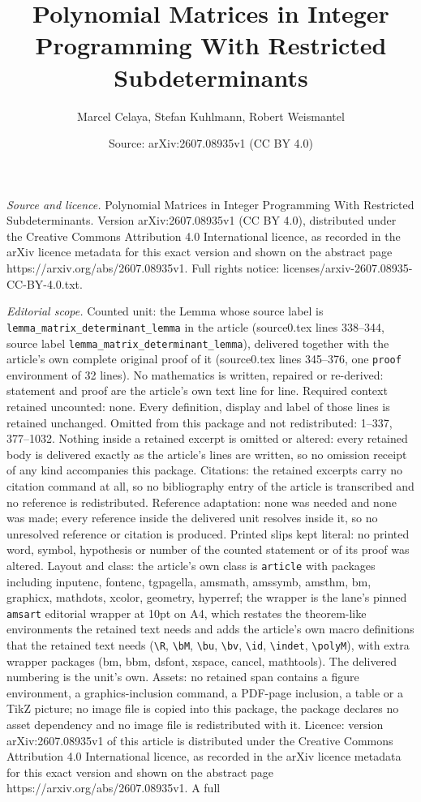 \documentclass[10pt,a4paper]{amsart}
\title[Polynomial Matrices in Integer Programming With Restricted S]{Polynomial Matrices in Integer Programming With Restricted Subdeterminants}
\author{Marcel Celaya, Stefan Kuhlmann, Robert Weismantel}
\date{Source: arXiv:2607.08935v1 (CC BY 4.0)}
\begin{document}
\maketitle

\noindent\emph{Source and licence.} Polynomial Matrices in Integer Programming With Restricted Subdeterminants. Version arXiv:2607.08935v1 (CC BY 4.0), distributed under the Creative Commons Attribution 4.0 International licence, as recorded in the arXiv licence metadata for this exact version and shown on the abstract page https://arxiv.org/abs/2607.08935v1. Full rights notice: licenses/arxiv-2607.08935-CC-BY-4.0.txt.\par\smallskip

\noindent\textit{Editorial scope.} Counted unit: the Lemma whose source label is \texttt{lemma\_matrix\_determinant\_lemma} in the article (source0.tex lines 338--344, source label \texttt{lemma\_matrix\_determinant\_lemma}), delivered together with the article's own complete original proof of it (source0.tex lines 345--376, one \texttt{proof} environment of 32 lines). No mathematics is written, repaired or re-derived: statement and proof are the article's own text line for line. Required context retained uncounted: none. Every definition, display and label of those lines is retained unchanged. Omitted from this package and not redistributed: 1--337, 377--1032. Nothing inside a retained excerpt is omitted or altered: every retained body is delivered exactly as the article's lines are written, so no omission receipt of any kind accompanies this package. Citations: the retained excerpts carry no citation command at all, so no bibliography entry of the article is transcribed and no reference is redistributed. Reference adaptation: none was needed and none was made; every reference inside the delivered unit resolves inside it, so no unresolved reference or citation is produced. Printed slips kept literal: no printed word, symbol, hypothesis or number of the counted statement or of its proof was altered. Layout and class: the article's own class is \texttt{article} with packages including inputenc, fontenc, tgpagella, amsmath, amssymb, amsthm, bm, graphicx, mathdots, xcolor, geometry, hyperref; the wrapper is the lane's pinned \texttt{amsart} editorial wrapper at 10pt on A4, which restates the theorem-like environments the retained text needs and adds the article's own macro definitions that the retained text needs (\texttt{\textbackslash R}, \texttt{\textbackslash bM}, \texttt{\textbackslash bu}, \texttt{\textbackslash bv}, \texttt{\textbackslash id}, \texttt{\textbackslash indet}, \texttt{\textbackslash polyM}), with extra wrapper packages (bm, bbm, dsfont, xspace, cancel, mathtools). The delivered numbering is the unit's own. Assets: no retained span contains a figure environment, a graphics-inclusion command, a PDF-page inclusion, a table or a TikZ picture; no image file is copied into this package, the package declares no asset dependency and no image file is redistributed with it. Licence: version arXiv:2607.08935v1 of this article is distributed under the Creative Commons Attribution 4.0 International licence, as recorded in the arXiv licence metadata for this exact version and shown on the abstract page https://arxiv.org/abs/2607.08935v1. A full 
\end{document}
